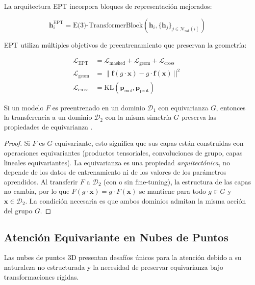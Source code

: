 La arquitectura EPT incorpora bloques de representación mejorados:

\begin{equation}
    \mathbf{h}_i^{\text{EPT}} = \text{E(3)-TransformerBlock}(\mathbf{h}_i, \{\mathbf{h}_j\}_{j \in \mathcal{N}_{\text{ext}}(i)})
    \label{eq:ept_enhanced_block}
\end{equation}

EPT utiliza múltiples objetivos de preentrenamiento que preservan la geometría:

\begin{align}
    \mathcal{L}_{\text{EPT}} &= \mathcal{L}_{\text{masked}} + \mathcal{L}_{\text{geom}} + \mathcal{L}_{\text{cross}} \\
    \mathcal{L}_{\text{geom}} &= \|\mathbf{f}(g \cdot \mathbf{x}) - g \cdot \mathbf{f}(\mathbf{x})\|^2 \\
    \mathcal{L}_{\text{cross}} &= \text{KL}(\mathbf{p}_{\text{mol}}, \mathbf{p}_{\text{prot}})
    \label{eq:ept_loss}
\end{align}

\begin{proposition}
    Si un modelo $F$ es preentrenado en un dominio $\mathcal{D}_1$ con equivarianza $G$, entonces la transferencia a un dominio $\mathcal{D}_2$ con la misma simetría $G$ preserva las propiedades de equivarianza \citep{jiao2024ept}.
\end{proposition}

\begin{proof}
Si $F$ es $G$-equivariante, esto significa que sus capas están construidas con operaciones equivariantes (productos tensoriales, convoluciones de grupo, capas lineales equivariantes). La equivarianza es una propiedad \emph{arquitectónica}, no depende de los datos de entrenamiento ni de los valores de los parámetros aprendidos. Al transferir $F$ a $\mathcal{D}_2$ (con o sin fine-tuning), la estructura de las capas no cambia, por lo que $F(g \cdot \mathbf{x}) = g \cdot F(\mathbf{x})$ se mantiene para todo $g \in G$ y $\mathbf{x} \in \mathcal{D}_2$. La condición necesaria es que ambos dominios admitan la misma acción del grupo $G$.
\end{proof}

\subsection{Atención Equivariante en Nubes de Puntos}

Las nubes de puntos 3D presentan desafíos únicos para la atención debido a su naturaleza no estructurada y la necesidad de preservar equivarianza bajo transformaciones rígidas.

